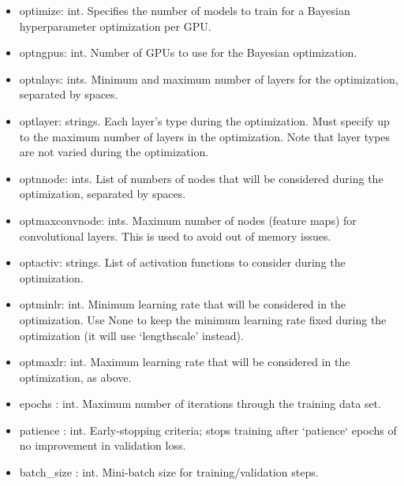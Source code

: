 \documentclass[letterpaper, 12pt]{article}
\begin{document}
\begin{itemize}
\item optimize: int. Specifies the number of models to train for a Bayesian 
                        hyperparameter optimization per GPU.
\item optngpus: int. Number of GPUs to use for the Bayesian optimization.
\item optnlays: ints. Minimum and maximum number of layers for the optimization, 
                        separated by spaces.
\item optlayer: strings. Each layer's type during the optimization.  Must specify 
                       up to the maximum number of layers in the optimization.  Note 
                       that layer types are not varied during the optimization.
\item optnnode: ints. List of numbers of nodes that will be considered during 
                         the optimization, separated by spaces.
\item optmaxconvnode: ints. Maximum number of nodes (feature maps) for 
                         convolutional layers.  This is used to avoid out of memory 
                         issues.
\item optactiv: strings. List of activation functions to consider during the optimization.
\item optminlr: int. Minimum learning rate that will be considered in the optimization.  
                       Use None to keep the minimum learning rate fixed during the 
                       optimization (it will use `lengthscale' instead).  
\item optmaxlr: int. Maximum learning rate that will be considered in the optimization, 
                       as above.

\item epochs     : int.  Maximum number of iterations through the training data set.
\item patience   : int.  Early-stopping criteria; stops training after `patience` 
                   epochs of no improvement in validation loss.
\item batch\_size : int.  Mini-batch size for training/validation steps.


\end{itemize}
\end{document}
